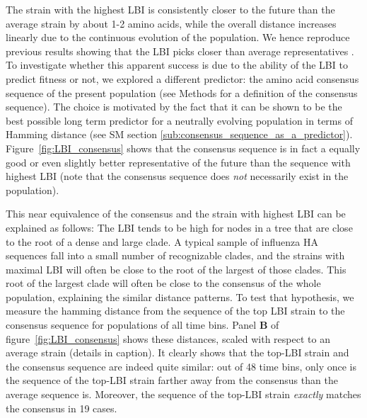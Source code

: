 \documentclass[reprint,amsmath,amssymb,superscriptaddress,showpacs,rmp]{revtex4-1}
\begin{document}
The strain with the highest LBI is consistently closer to the future than the average strain by about 1-2 amino acids, while the overall distance increases linearly due to the continuous evolution of the population.
We hence reproduce previous results showing that the LBI picks closer than average representatives \citep{neher_predicting_2014}.
To investigate whether this apparent success is due to the ability of the LBI to predict fitness or not, we explored a different predictor: the amino acid consensus sequence of the present population (see Methods for a definition of the consensus sequence). 
The choice is motivated by the fact that it can be shown to be the best possible long term predictor for a neutrally evolving population in terms of Hamming distance (see SM section \ref{sub:consensus_sequence_as_a_predictor}). 
Figure~\ref{fig:LBI_consensus} shows that the consensus sequence is in fact a equally good or even slightly better representative of the future than the sequence with highest LBI 
(note that the consensus sequence does \emph{not} necessarily exist in the population). 

This near equivalence of the consensus and the strain with highest LBI can be explained as follows:
The LBI tends to be high for nodes in a tree that are close to the root of a dense and large clade. 
A typical sample of influenza HA sequences fall into a small number of recognizable clades, and the strains with maximal LBI will often be close to the root of the largest of those clades. 
This root of the largest clade will often be close to the consensus of the whole population, explaining the similar distance patterns.
To test that hypothesis, we measure the hamming distance from the sequence of the top LBI strain to the consensus sequence for populations of all time bins. 
Panel \textbf{B} of figure~\ref{fig:LBI_consensus} shows these distances, scaled with respect to an average strain (details in caption). It clearly shows that the top-LBI strain and the consensus sequence are indeed quite similar: out of 48 time bins, only once is the sequence of the top-LBI strain farther away from the consensus than the average sequence is. Moreover, the sequence of the top-LBI strain \emph{exactly} matches the consensus in 19 cases. 
\end{document}
